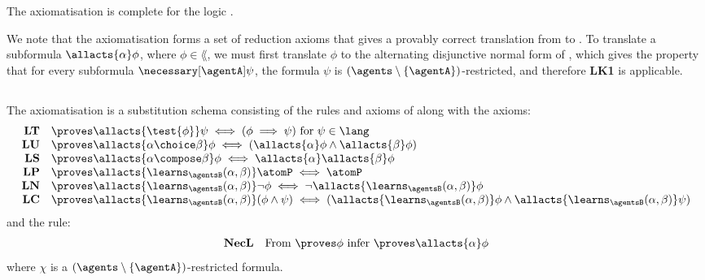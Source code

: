 \documentclass[twoside]{aiml14}
\begin{document}
  \begin{proposition}\label{afl-kff-axioms-completeness}
      The axiomatisation \axiomAflKFF{} is complete for the logic \logicAmlKFF{}.
  \end{proposition}

  We note that the axiomatisation \axiomAflKFF{} forms a set of reduction
  axioms that gives a provably correct translation from \langAfl{} to \lang{}.
  To translate a subformula $\allacts{\alpha} \phi$, where $\phi \in \lang$, we
  must first translate $\phi$ to the alternating disjunctive normal form of
  \cite{hales2012}, which gives the property that for every subformula
  $\necessary[\agentA] \psi$, the formula $\psi$ is $(\agents \setminus
  \{\agentA\})$-restricted, and therefore {\bf LK1} is applicable.

  \subsection{\classS{}}

  \begin{definition}\label{afl-s-axioms}
      The axiomatisation \axiomAflS{} is a substitution schema consisting of the
      rules and axioms of \axiomS{} along with the axioms:
      $$
      \begin{array}{rl}
          {\bf LT} & \proves \allacts{\test{\phi}} \psi \iff (\phi \implies \psi) \text{ for } \psi \in \lang\\
          {\bf LU} & \proves \allacts{\alpha \choice \beta} \phi \iff (\allacts{\alpha} \phi \land \allacts{\beta} \phi)\\
          {\bf LS} & \proves \allacts{\alpha \compose \beta} \phi \iff \allacts{\alpha} \allacts{\beta} \phi\\
          {\bf LP} & \proves \allacts{\learns_\agentsB (\alpha, \beta)} \atomP \iff \atomP\\
          {\bf LN} & \proves \allacts{\learns_\agentsB (\alpha, \beta)} \neg \phi \iff \neg \allacts{\learns_\agentsB (\alpha, \beta)} \phi\\
          {\bf LC} & \proves \allacts{\learns_\agentsB (\alpha, \beta)} (\phi \land \psi) \iff (\allacts{\learns_\agentsB (\alpha, \beta)} \phi \land \allacts{\learns_\agentsB (\alpha, \beta)} \psi)\\
      \end{array}
      $$
      and the rule:
      $$
      \begin{array}{rl}
          {\bf NecL} & \text{From $\proves \phi$ infer $\proves \allacts{\alpha} \phi$}
      \end{array}
      $$
      where $\chi$ is a $(\agents \setminus \{\agentA\})$-restricted formula.
  \end{definition}
\end{document}
